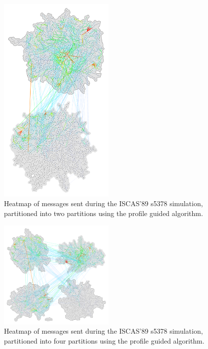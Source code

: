 \documentclass[11pt]{book}
\begin{document}
\begin{figure}
\centering
\includegraphics[clip=true,width=0.5\textwidth]{figs/s5378_2part.pdf}
\caption{Heatmap of messages sent during the ISCAS'89 s5378 simulation, partitioned into two partitions using the profile guided algorithm.}
\end{figure}

\begin{figure}
\centering
\includegraphics[clip=true,width=0.5\textwidth]{figs/s5378_4part.pdf}
\caption{Heatmap of messages sent during the ISCAS'89 s5378 simulation, partitioned into four partitions using the profile guided algorithm.}
\end{figure}
\end{document}
